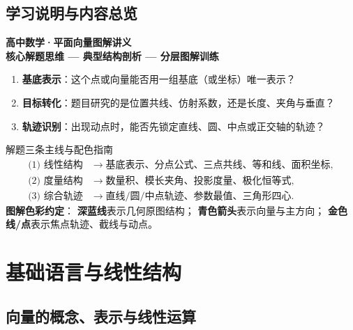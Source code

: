 \documentclass[11pt,a4paper,openany]{ctexbook}
\begin{document}
\frontmatter
\chapter*{学习说明与内容总览}

\begin{tcolorbox}[colback=navy!6,colframe=navy,arc=2mm,boxrule=0.8pt,halign=center]
{\Large\bfseries\sffamily\color{navy} 高中数学·平面向量图解讲义}\\[0.25em]
{\small\color{teal}\bfseries 核心解题思维 — 典型结构剖析 — 分层图解训练}
\end{tcolorbox}

\begin{methodbox}[title={解题核心三问}]
\begin{enumerate}
  \item \textbf{基底表示}：这个点或向量能否用一组基底（或坐标）唯一表示？
  \item \textbf{目标转化}：题目研究的是位置共线、仿射系数，还是长度、夹角与垂直？
  \item \textbf{轨迹识别}：出现动点时，能否先锁定直线、圆、中点或正交轴的轨迹？
\end{enumerate}
\end{methodbox}

\begin{summarybox}{解题三条主线与配色指南}
\[
\begin{aligned}
\text{(1) 线性结构}&\longrightarrow\text{基底表示、分点公式、三点共线、等和线、面积坐标},\\
\text{(2) 度量结构}&\longrightarrow\text{数量积、模长夹角、投影度量、极化恒等式},\\
\text{(3) 综合轨迹}&\longrightarrow\text{直线/圆/中点轨迹、参数最值、三角形四心}.
\end{aligned}
\]
\vspace{0.4em}
\tcblower
\textbf{图解色彩约定}：
\textbf{深蓝线}表示几何原图结构；
\textbf{青色箭头}表示向量与主方向；
\textbf{金色线/点}表示焦点轨迹、截线与动点。
\end{summarybox}

\tableofcontents

\mainmatter
\part{基础语言与线性结构}

\chapter{向量的概念、表示与线性运算}
\end{document}
